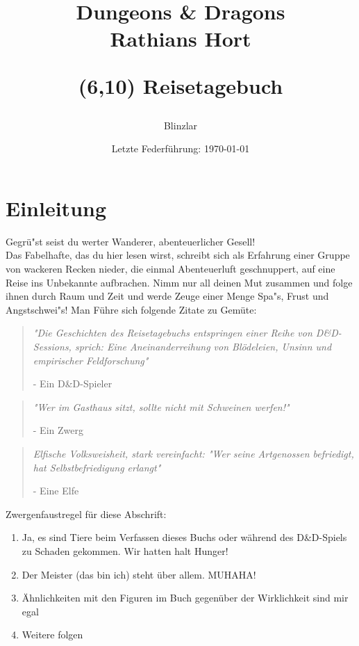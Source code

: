\documentclass[11pt, openany]{article} %
\title{\fontsize{40pt}{42pt}\selectfont Dungeons \& Dragons \\
Rathians Hort
\author{Blinzlar}
\date{Letzte Federf\"uhrung: \today}
\begin{textblock}{4}(6,10)
\Huge Reisetagebuch
\end{textblock}
}
\begin{document}
\maketitle
\newpage
\tableofcontents
\newpage

\section{Einleitung}

Gegr\"u"st seist du werter Wanderer, abenteuerlicher Gesell!\\ Das Fabelhafte, das du hier lesen wirst, schreibt sich als Erfahrung einer Gruppe von wackeren Recken nieder, die einmal Abenteuerluft geschnuppert, auf eine Reise ins Unbekannte aufbrachen. Nimm nur all deinen Mut zusammen und folge ihnen durch Raum und Zeit und werde Zeuge einer Menge Spa"s, Frust und Angstschwei"s! Man F\"uhre sich folgende Zitate zu Gem\"ute:

\begin{quote}
    \textit{"Die Geschichten des Reisetagebuchs entspringen einer Reihe von D\&D-Sessions, sprich: Eine Aneinanderreihung von Bl\"odeleien, Unsinn und empirischer Feldforschung"}
    \begin{flushright}
        - Ein D\&D-Spieler
    \end{flushright}
\end{quote}

\begin{quote}
    \textit{"Wer im Gasthaus sitzt, sollte nicht mit Schweinen werfen!"}
    \begin{flushright}
        - Ein Zwerg
    \end{flushright}
\end{quote}

\begin{quote}
    \textit{Elfische Volksweisheit, stark vereinfacht: "Wer seine Artgenossen befriedigt, hat Selbstbefriedigung erlangt"}
    \begin{flushright}
        - Eine Elfe
    \end{flushright}
\end{quote}

Zwergenfaustregel f\"ur diese Abschrift:
\begin{enumerate}
    \item[1.] Ja, es sind Tiere beim Verfassen dieses Buchs oder w\"ahrend des D\&D-Spiels zu Schaden gekommen. Wir hatten halt Hunger!
    \item[2.] Der Meister (das bin ich) steht \"uber allem. MUHAHA!
    \item[3.] \"Ahnlichkeiten mit den Figuren im Buch gegen\"uber der Wirklichkeit sind mir egal
    \item[4.] Weitere folgen
\end{enumerate}
\end{document}
